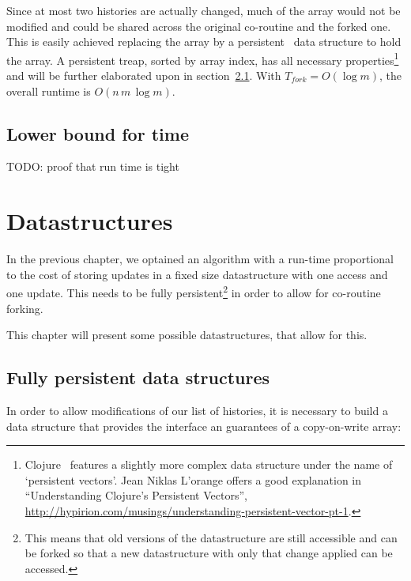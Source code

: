 \documentclass[11pt]{Thesis}
\theoremstyle{definition}
\newcommand{\Secref}[1]{section~\ref{sec:#1}}
\newcommand{\seclabel}[1]{\label{sec:#1}}
\begin{document}
Since at most two histories are actually changed, much of the 
array would not be modified and could be shared across the original
co-routine and the forked one. This is easily achieved replacing the
array by a persistent~\cite{Dris89a} data structure to hold the 
array. A persistent treap, sorted by array index, has all necessary
properties\footnote{Clojure~\cite{Hick08} features a slightly more complex data
structure under the name of `persistent vectors'. Jean Niklas L'orange offers a
good explanation in ``Understanding Clojure's Persistent Vectors'',
\url{http://hypirion.com/musings/understanding-persistent-vector-pt-1}.} and
will be further elaborated upon in \Secref{treap}. With $T_{fork}=O(\log m)$,
the overall runtime is $O(n\,m\,\log m)$.

\section{Lower bound for time}\seclabel{lower-bound}
TODO: proof that run time is tight\cite{Ellul05a}

\chapter{Datastructures}
In the previous chapter, we optained an algorithm with a run-time 
proportional to the cost of storing updates in a fixed size datastructure 
with one access and one update. This needs to be fully 
persistent\footnote{This means that old versions of the datastructure are 
  still accessible and can be forked so that a new datastructure with only 
that change applied can be accessed.} in order to allow for co-routine forking.

This chapter will present some possible datastructures, that allow for this.

\section{Fully persistent data structures}	\seclabel{treap}\seclabel{data-structures}
In order to allow modifications of our list of histories, it is
necessary to build a data structure that provides the interface an guarantees 
of a copy-on-write array:
\end{document}
